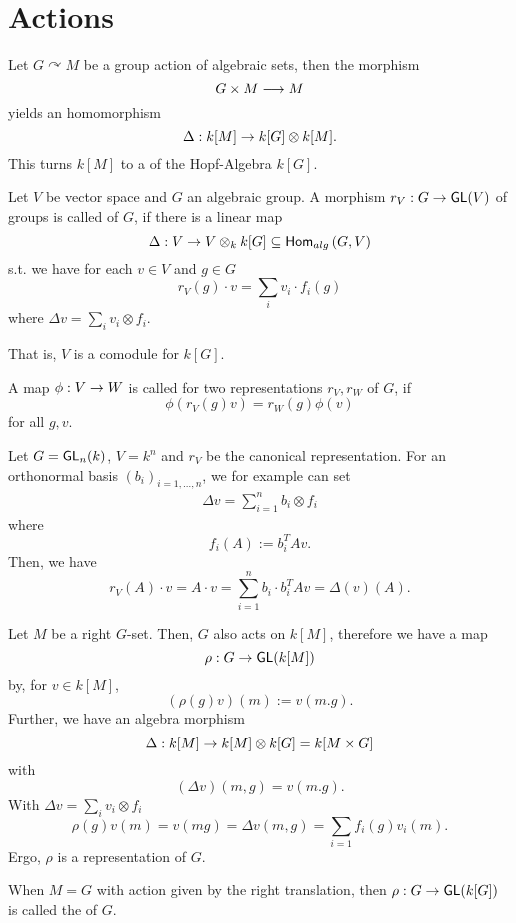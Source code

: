 \section{Actions}

\begin{remark}
	Let $G \curvearrowright M$ be a group action of algebraic sets, then the morphism
	\[ G\times M \overset{}{\longrightarrow} M \]
	yields an homomorphism
	\[ \Delta : k[M] \overset{}{\rightarrow} k[G]\otimes k[M].  \]
	This turns $k[M]$ to a  of the Hopf-Algebra $k[G]$.
\end{remark}

\begin{definition}
	Let $V$ be vector space and $G$ an algebraic group. A morphism $r_V : G \overset{}{\rightarrow} \textsf{GL}(V)$ of groups is called  of $G$, if there is a linear map
	\[ \Delta : V \overset{}{\rightarrow} V \otimes_k k[G] \subseteq \textsf{Hom}_{alg}\left(G, V\right) \]
	s.t. we have for each $v \in V$ and $g \in G$
	\[r_V(g)\cdot v = \sum_{i} v_i \cdot  f_i(g)  \]
	where $\Delta v =\sum_{i} v_i \otimes f_i $.
	
	That is, $V$ is a comodule for $k[G]$.
	
	A map $\phi : V \overset{}{\rightarrow} W$ is called  for two representations $r_V, r_W$ of $G$, if
	\[ \phi(r_V(g) v) = r_W(g)\phi(v) \]
	for all $g,v$.
\end{definition}
\begin{example}
	Let $G = \textsf{GL}_n(k)$, $V = k^n$ and $r_V$ be the canonical representation. For an orthonormal basis $(b_i)_{i = 1,\ldots, n}$, we for example can set
	\begin{align*}
	\Delta v = \sum_{i = 1}^n b_i \otimes f_i
	\end{align*}
	where
	\[ f_i(A) := b_i^T A v. \]
	Then, we have 
	\[ r_V(A) \cdot v = A \cdot v = \sum_{i= 1}^nb_i \cdot b_i^T A v = \Delta(v)(A). \]
\end{example}

\begin{example}
	Let $M$ be a right $G$-set. Then, $G$ also acts on $k[M]$, therefore we have a map
	\[ \rho : G \overset{}{\rightarrow} \textsf{GL}(k[M]) \]
	by, for $v \in k[M]$,
	\[ (\rho(g)v)(m) := v(m.g). \]
	Further, we have an algebra morphism
	\[ \Delta : k[M] \overset{}{\rightarrow} k[M] \otimes k[G] = k[M\times G] \]
	with
	\[ (\Delta v) (m, g) = v(m.g). \]
	With $\Delta v = \sum_{i} v_i \otimes f_i$
	\[ \rho(g) v(m) = v(mg) = \Delta v(m, g) = \sum_{i= 1}f_i(g)v_i(m). \]
	Ergo, $\rho$ is a representation of $G$.
	
	
	When $M = G$ with action given by the right translation, then $\rho : G \overset{}{\rightarrow} \textsf{GL}(k[G])$ is called the  of $G$.
\end{example}

